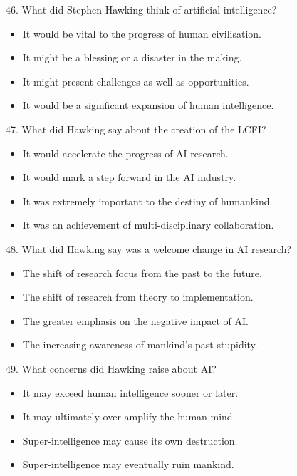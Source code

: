 \documentclass[UTF8,11pt]{ctexart}
\begin{document}
46. What did Stephen Hawking think of artificial intelligence?


\begin{itemize}[leftmargin=2em,itemsep=.2em,topsep=.4em]\item[A.] It would be vital to the progress of human civilisation.
\item[B.] It might be a blessing or a disaster in the making.
\item[C.] It might present challenges as well as opportunities.
\item[D.] It would be a significant expansion of human intelligence.
\end{itemize}

47. What did Hawking say about the creation of the LCFI?


\begin{itemize}[leftmargin=2em,itemsep=.2em,topsep=.4em]\item[A.] It would accelerate the progress of AI research.
\item[B.] It would mark a step forward in the AI industry.
\item[C.] It was extremely important to the destiny of humankind.
\item[D.] It was an achievement of multi-disciplinary collaboration.
\end{itemize}

48. What did Hawking say was a welcome change in AI research?


\begin{itemize}[leftmargin=2em,itemsep=.2em,topsep=.4em]\item[A.] The shift of research focus from the past to the future.
\item[B.] The shift of research from theory to implementation.
\item[C.] The greater emphasis on the negative impact of AI.
\item[D.] The increasing awareness of mankind’s past stupidity.
\end{itemize}

49. What concerns did Hawking raise about AI?


\begin{itemize}[leftmargin=2em,itemsep=.2em,topsep=.4em]\item[A.] It may exceed human intelligence sooner or later.
\item[B.] It may ultimately over-amplify the human mind.
\item[C.] Super-intelligence may cause its own destruction.
\item[D.] Super-intelligence may eventually ruin mankind.
\end{itemize}
\end{document}
